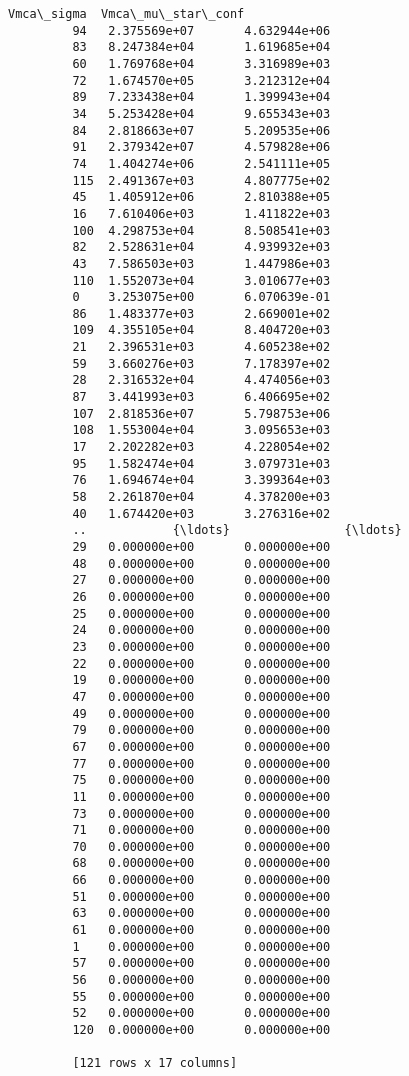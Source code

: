 \documentclass[11pt]{article}
\begin{document}
\begin{Verbatim}[commandchars=\\\{\}]
                Vmca\_sigma  Vmca\_mu\_star\_conf  
         94   2.375569e+07       4.632944e+06  
         83   8.247384e+04       1.619685e+04  
         60   1.769768e+04       3.316989e+03  
         72   1.674570e+05       3.212312e+04  
         89   7.233438e+04       1.399943e+04  
         34   5.253428e+04       9.655343e+03  
         84   2.818663e+07       5.209535e+06  
         91   2.379342e+07       4.579828e+06  
         74   1.404274e+06       2.541111e+05  
         115  2.491367e+03       4.807775e+02  
         45   1.405912e+06       2.810388e+05  
         16   7.610406e+03       1.411822e+03  
         100  4.298753e+04       8.508541e+03  
         82   2.528631e+04       4.939932e+03  
         43   7.586503e+03       1.447986e+03  
         110  1.552073e+04       3.010677e+03  
         0    3.253075e+00       6.070639e-01  
         86   1.483377e+03       2.669001e+02  
         109  4.355105e+04       8.404720e+03  
         21   2.396531e+03       4.605238e+02  
         59   3.660276e+03       7.178397e+02  
         28   2.316532e+04       4.474056e+03  
         87   3.441993e+03       6.406695e+02  
         107  2.818536e+07       5.798753e+06  
         108  1.553004e+04       3.095653e+03  
         17   2.202282e+03       4.228054e+02  
         95   1.582474e+04       3.079731e+03  
         76   1.694674e+04       3.399364e+03  
         58   2.261870e+04       4.378200e+03  
         40   1.674420e+03       3.276316e+02  
         ..            {\ldots}                {\ldots}  
         29   0.000000e+00       0.000000e+00  
         48   0.000000e+00       0.000000e+00  
         27   0.000000e+00       0.000000e+00  
         26   0.000000e+00       0.000000e+00  
         25   0.000000e+00       0.000000e+00  
         24   0.000000e+00       0.000000e+00  
         23   0.000000e+00       0.000000e+00  
         22   0.000000e+00       0.000000e+00  
         19   0.000000e+00       0.000000e+00  
         47   0.000000e+00       0.000000e+00  
         49   0.000000e+00       0.000000e+00  
         79   0.000000e+00       0.000000e+00  
         67   0.000000e+00       0.000000e+00  
         77   0.000000e+00       0.000000e+00  
         75   0.000000e+00       0.000000e+00  
         11   0.000000e+00       0.000000e+00  
         73   0.000000e+00       0.000000e+00  
         71   0.000000e+00       0.000000e+00  
         70   0.000000e+00       0.000000e+00  
         68   0.000000e+00       0.000000e+00  
         66   0.000000e+00       0.000000e+00  
         51   0.000000e+00       0.000000e+00  
         63   0.000000e+00       0.000000e+00  
         61   0.000000e+00       0.000000e+00  
         1    0.000000e+00       0.000000e+00  
         57   0.000000e+00       0.000000e+00  
         56   0.000000e+00       0.000000e+00  
         55   0.000000e+00       0.000000e+00  
         52   0.000000e+00       0.000000e+00  
         120  0.000000e+00       0.000000e+00  
         
         [121 rows x 17 columns]
\end{Verbatim}
            
\end{document}
